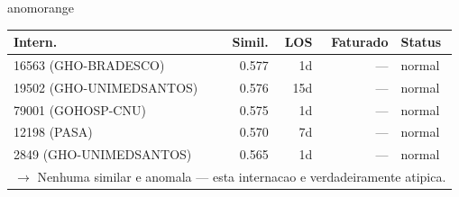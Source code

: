 \documentclass[a4paper,10pt]{article}
\begin{document}
\begin{anomalycard}[Internacao 179166 | PASA | ALTO (z=4.18)]{anomorange}
\begin{tabular}{l r r r l}\toprule\textbf{Intern.} & \textbf{Simil.} & \textbf{LOS} & \textbf{Faturado} & \textbf{Status} \\\midrule
16563 (GHO-BRADESCO) & 0.577 & 1d & --- & \textcolor{jcubeblue}{normal} \\
19502 (GHO-UNIMEDSANTOS) & 0.576 & 15d & --- & \textcolor{jcubeblue}{normal} \\
79001 (GOHOSP-CNU) & 0.575 & 1d & --- & \textcolor{jcubeblue}{normal} \\
12198 (PASA) & 0.570 & 7d & --- & \textcolor{jcubeblue}{normal} \\
2849 (GHO-UNIMEDSANTOS) & 0.565 & 1d & --- & \textcolor{jcubeblue}{normal} \\
\multicolumn{5}{l}{\textcolor{jcubeblue}{\small $\rightarrow$ Nenhuma similar e anomala --- esta internacao e verdadeiramente atipica.}} \\
\bottomrule\end{tabular}



\end{anomalycard}
\end{document}
